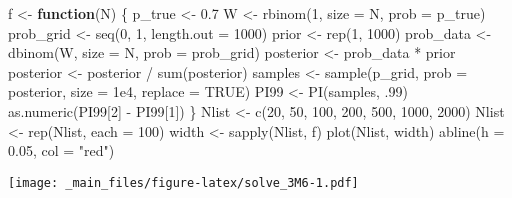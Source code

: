 \documentclass[
]{book}
\newenvironment{Shaded}{\begin{snugshade}}{\end{snugshade}}
\newcommand{\AttributeTok}[1]{\textcolor[rgb]{0.77,0.63,0.00}{#1}}
\newcommand{\ConstantTok}[1]{\textcolor[rgb]{0.00,0.00,0.00}{#1}}
\newcommand{\ControlFlowTok}[1]{\textcolor[rgb]{0.13,0.29,0.53}{\textbf{#1}}}
\newcommand{\DecValTok}[1]{\textcolor[rgb]{0.00,0.00,0.81}{#1}}
\newcommand{\FloatTok}[1]{\textcolor[rgb]{0.00,0.00,0.81}{#1}}
\newcommand{\FunctionTok}[1]{\textcolor[rgb]{0.00,0.00,0.00}{#1}}
\newcommand{\NormalTok}[1]{#1}
\newcommand{\OtherTok}[1]{\textcolor[rgb]{0.56,0.35,0.01}{#1}}
\newcommand{\SpecialCharTok}[1]{\textcolor[rgb]{0.00,0.00,0.00}{#1}}
\newcommand{\StringTok}[1]{\textcolor[rgb]{0.31,0.60,0.02}{#1}}
\begin{document}
\begin{Shaded}
\begin{Highlighting}[]
\NormalTok{f }\OtherTok{\textless{}{-}} \ControlFlowTok{function}\NormalTok{(N) \{}
\NormalTok{  p\_true }\OtherTok{\textless{}{-}} \FloatTok{0.7}
\NormalTok{  W }\OtherTok{\textless{}{-}} \FunctionTok{rbinom}\NormalTok{(}\DecValTok{1}\NormalTok{, }\AttributeTok{size =}\NormalTok{ N, }\AttributeTok{prob =}\NormalTok{ p\_true)}
\NormalTok{  prob\_grid }\OtherTok{\textless{}{-}} \FunctionTok{seq}\NormalTok{(}\DecValTok{0}\NormalTok{, }\DecValTok{1}\NormalTok{, }\AttributeTok{length.out =} \DecValTok{1000}\NormalTok{)}
\NormalTok{  prior }\OtherTok{\textless{}{-}} \FunctionTok{rep}\NormalTok{(}\DecValTok{1}\NormalTok{, }\DecValTok{1000}\NormalTok{)}
\NormalTok{  prob\_data }\OtherTok{\textless{}{-}} \FunctionTok{dbinom}\NormalTok{(W, }\AttributeTok{size =}\NormalTok{ N, }\AttributeTok{prob =}\NormalTok{ prob\_grid)}
\NormalTok{  posterior }\OtherTok{\textless{}{-}}\NormalTok{ prob\_data }\SpecialCharTok{*}\NormalTok{ prior}
\NormalTok{  posterior }\OtherTok{\textless{}{-}}\NormalTok{ posterior }\SpecialCharTok{/} \FunctionTok{sum}\NormalTok{(posterior)}
\NormalTok{  samples }\OtherTok{\textless{}{-}} \FunctionTok{sample}\NormalTok{(p\_grid, }\AttributeTok{prob =}\NormalTok{ posterior, }\AttributeTok{size =} \FloatTok{1e4}\NormalTok{, }\AttributeTok{replace =} \ConstantTok{TRUE}\NormalTok{)}
\NormalTok{  PI99 }\OtherTok{\textless{}{-}} \FunctionTok{PI}\NormalTok{(samples, .}\DecValTok{99}\NormalTok{)}
  \FunctionTok{as.numeric}\NormalTok{(PI99[}\DecValTok{2}\NormalTok{] }\SpecialCharTok{{-}}\NormalTok{ PI99[}\DecValTok{1}\NormalTok{])}
\NormalTok{\}}
\NormalTok{Nlist }\OtherTok{\textless{}{-}} \FunctionTok{c}\NormalTok{(}\DecValTok{20}\NormalTok{, }\DecValTok{50}\NormalTok{, }\DecValTok{100}\NormalTok{, }\DecValTok{200}\NormalTok{, }\DecValTok{500}\NormalTok{, }\DecValTok{1000}\NormalTok{, }\DecValTok{2000}\NormalTok{)}
\NormalTok{Nlist }\OtherTok{\textless{}{-}} \FunctionTok{rep}\NormalTok{(Nlist, }\AttributeTok{each =} \DecValTok{100}\NormalTok{)}
\NormalTok{width }\OtherTok{\textless{}{-}} \FunctionTok{sapply}\NormalTok{(Nlist, f)}
\FunctionTok{plot}\NormalTok{(Nlist, width)}
\FunctionTok{abline}\NormalTok{(}\AttributeTok{h =} \FloatTok{0.05}\NormalTok{, }\AttributeTok{col =} \StringTok{"red"}\NormalTok{)}
\end{Highlighting}
\end{Shaded}

\texttt{[image: \_main\_files/figure-latex/solve\_3M6-1.pdf]}
\end{document}
